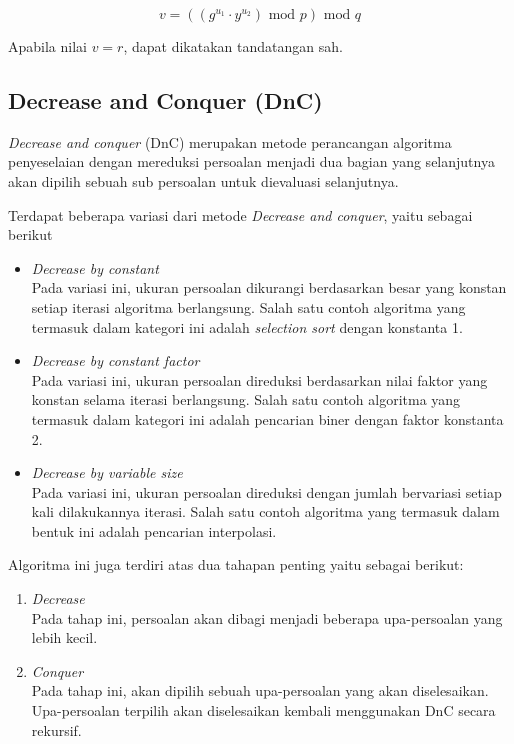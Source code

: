 \documentclass[10pt,conference]{IEEEtran}
\theoremstyle{definition}
\begin{document}
\begin{equation} \label{eq:dsa6} 
    v = ((g^{u_1} \cdot y^{u_2}) \text{ mod } p) \text{ mod } q
\end{equation}

Apabila nilai $v = r$, dapat dikatakan tandatangan sah.

\subsection{Decrease and Conquer (DnC)}

\emph{Decrease and conquer} (DnC) merupakan metode perancangan algoritma penyeselaian dengan mereduksi persoalan menjadi dua bagian yang selanjutnya akan dipilih sebuah sub persoalan untuk dievaluasi selanjutnya. \cite{ppt1}

Terdapat beberapa variasi dari metode \emph{Decrease and conquer}, yaitu sebagai berikut

\begin{itemize}
    \item \emph{Decrease by constant} \\
    Pada variasi ini, ukuran persoalan dikurangi berdasarkan besar yang konstan setiap iterasi algoritma berlangsung. Salah satu contoh algoritma yang termasuk dalam kategori ini adalah \emph{selection sort} dengan konstanta 1.
    \item \emph{Decrease by constant factor} \\
    Pada variasi ini, ukuran persoalan direduksi berdasarkan nilai faktor yang konstan selama iterasi berlangsung. Salah satu contoh algoritma yang termasuk dalam kategori ini adalah pencarian biner dengan faktor konstanta 2.
    \item \emph{Decrease by variable size} \\
    Pada variasi ini, ukuran persoalan direduksi dengan jumlah bervariasi setiap kali dilakukannya iterasi.  Salah satu contoh algoritma yang termasuk dalam bentuk ini adalah pencarian interpolasi.
\end{itemize}

Algoritma ini juga terdiri atas dua tahapan penting yaitu sebagai berikut:
\begin{enumerate}
    \item \emph{Decrease} \\
    Pada tahap ini, persoalan  akan dibagi menjadi beberapa upa-persoalan yang lebih kecil.
    \item \emph{Conquer} \\
    Pada tahap ini, akan dipilih sebuah upa-persoalan yang akan diselesaikan. Upa-persoalan terpilih akan diselesaikan kembali menggunakan DnC secara  rekursif.
\end{enumerate}
\end{document}
